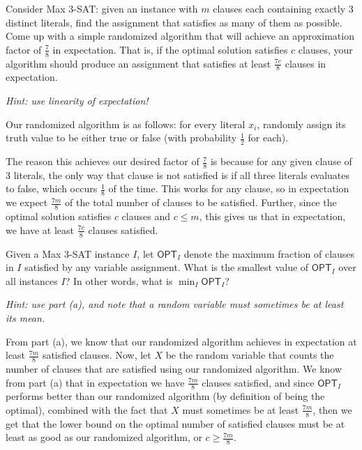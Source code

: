 \documentclass[11pt]{article}
\begin{document}
\begin{subparts}
\subpart Consider Max 3-SAT: given an instance with $m$ clauses each containing exactly 3 distinct literals, find the assignment that satisfies as many of them as possible. Come up with a simple randomized algorithm that will achieve an approximation factor of $\frac{7}{8}$ in expectation. That is, if the optimal solution satisfies $c$ clauses, your algorithm should produce an assignment that satisfies at least $\frac{7c}{8}$ clauses in expectation. 

\emph{Hint: use linearity of expectation!}

\begin{solution}
	Our randomized algorithm is as follows: for every literal \( x_i \), randomly assign its truth value to be either true or 
	false (with probability \( \frac{1}{2}  \) for each). 

	The reason this achieves our desired factor of \( \frac{7}{8}  \) is because for any given clause of \( 3 \) literals, the only 
	way that clause is not satisfied is if all three literals evaluates to false, which occurs \( \frac{1}{8} \) of the time. 
	This works for any clause, so in expectation we expect \( \frac{7m}{8} \) of the total number of clauses to be satisfied. 
	Further, since the optimal solution satisfies \( c \) clauses and \( c \le  m \), this gives us that in expectation, we 
	have at least \( \frac{7c}{8} \) clauses satisfied. 
\end{solution}

\subpart Given a Max 3-SAT instance $I$, let $\mathsf{OPT}_I$ denote the maximum fraction of clauses in $I$ satisfied by any variable assignment. What is the smallest value of $\mathsf{OPT}_I$ over all instances $I$? In other words, what is $\min_I \mathsf{OPT}_I$? 

\emph{Hint: use part (a), and note that a random variable must sometimes be at least its mean.}

\begin{solution}
	From part (a), we know that our randomized algorithm achieves in expectation at least \( \frac{7m}{8} \) satisfied clauses. 
	Now, let \( X \) be the random variable that counts the number of clauses that are satisfied using our randomized algorithm. 
	We know from part (a) that 
	in expectation we have \( \frac{7m}{8} \) clauses satisfied, and since \( \mathsf{OPT}_I \) performs better than our randomized 
	algorithm (by definition of being the optimal), combined with the fact that \( X \) must sometimes be at least 
	\( \frac{7m}{8} \), then we get that the lower bound on the optimal number of satisfied clauses must be at least as good as 
	our randomized algorithm, or \( c \ge \frac{7m}{8} \). 
\end{solution}


\end{subparts}
\end{document}
